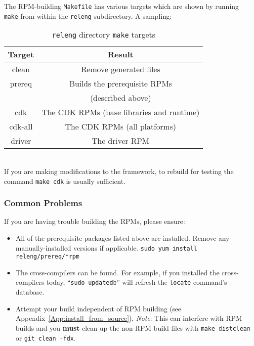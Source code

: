 \begin{appendices}
The RPM-building \texttt{Makefile} has various targets which are shown by running \texttt{make} from within the \texttt{releng} subdirectory. A sampling:

\begin{table}[H]
\begin{minipage}{\textwidth}
\begin{center}
\caption {\texttt{releng} directory \texttt{make} targets}
\label{table:make_releng}
\begin{tabular}{|c|c|}
\hline
\rowcolor{blue}
Target & Result \\
\hline
clean & Remove generated files
\\
\hline
prereq & Builds the prerequisite RPMs\\&(described above)
\\
\hline
cdk & The CDK RPMs (base libraries and runtime)
\\
\hline
cdk-all & The CDK RPMs (all platforms)
\\
\hline
driver & The driver RPM
\\
\hline
\end{tabular}
\end{center}
\end{minipage}
\end{table}
~\\

If you are making modifications to the framework, to rebuild for testing the command \texttt{make cdk} is usually sufficient.

\subsubsection{Common Problems}
If you are having trouble building the RPMs, please ensure:
\begin{itemize}
\item All of the prerequisite packages listed above are installed.
\subitem Remove any manually-installed versions if applicable.
\subitem \texttt{sudo yum install releng/prereq/*rpm}
\item The cross-compilers can be found.
\subitem For example, if you installed the cross-compilers today, ``\texttt{sudo updatedb}'' will refresh the \texttt{locate} command's database.
\item Attempt your build independent of RPM building (see Appendix~\ref{App:install_from_source}).
\subitem \textit{Note}: This can interfere with RPM builds and you \textbf{must} clean up the non-RPM build files with \texttt{make distclean} or \texttt{git clean -fdx}.
\end{itemize}


\end{appendices}
